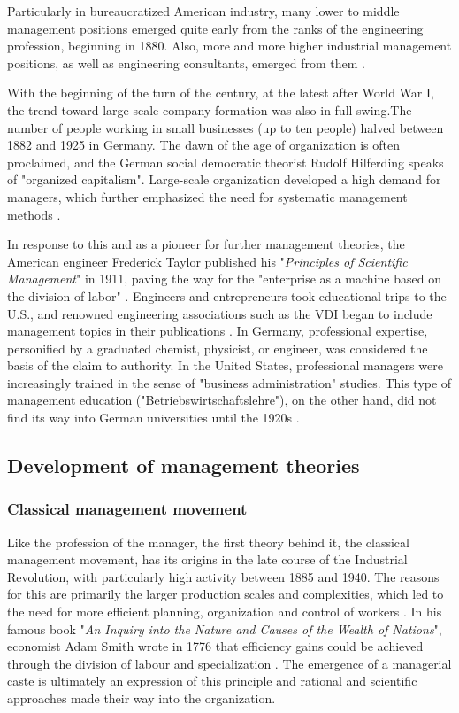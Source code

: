 \documentclass[a4paper,12pt]{article}
\begin{document}
Particularly in bureaucratized American industry, many lower to middle
management positions emerged quite early from the ranks of the engineering
profession, beginning in 1880. Also, more and more higher industrial
management positions, as well as engineering consultants, emerged from them
\cite{gispen:2006}.

With the beginning of the turn of the century, at the latest after World War
I, the trend toward large-scale company formation was also in full swing.The
number of people working in small businesses (up to ten people) halved between
1882 and 1925 in Germany. The dawn of the age of organization is often
proclaimed, and the German social democratic theorist Rudolf Hilferding speaks
of "organized capitalism".  Large-scale organization developed a high demand
for managers, which further emphasized the need for systematic management
methods \cite{gispen:2006}.

In response to this and as a pioneer for further management theories, the
American engineer Frederick Taylor published his "\textit{Principles of
  Scientific Management}" in 1911, paving the way for the "enterprise as a
machine based on the division of labor" \cite{oelsnitz:2009}. Engineers and
entrepreneurs took educational trips to the U.S., and renowned engineering
associations such as the VDI began to include management topics in their
publications \cite{kocka:1999}. In Germany, professional expertise,
personified by a graduated chemist, physicist, or engineer, was considered the
basis of the claim to authority. In the United States, professional managers
were increasingly trained in the sense of "business administration" studies.
This type of management education ("Betriebswirtschaftslehre"), on the other
hand, did not find its way into German universities until the 1920s
\cite{kocka:1999}.

\subsection{Development of management theories}

\subsubsection{Classical management movement}
Like the profession of the manager, the first theory behind it, the classical
management movement, has its origins in the late course of the Industrial
Revolution, with particularly high activity between 1885 and 1940. The reasons
for this are primarily the larger production scales and complexities, which
led to the need for more efficient planning, organization and control of
workers \cite{pindur:1995}. In his famous book "\textit{An Inquiry into the
  Nature and Causes of the Wealth of Nations}", economist Adam Smith wrote in
1776 that efficiency gains could be achieved through the division of labour
and specialization \cite{smith:2008}. The emergence of a managerial caste is
ultimately an expression of this principle and rational and scientific
approaches made their way into the organization.
\end{document}
